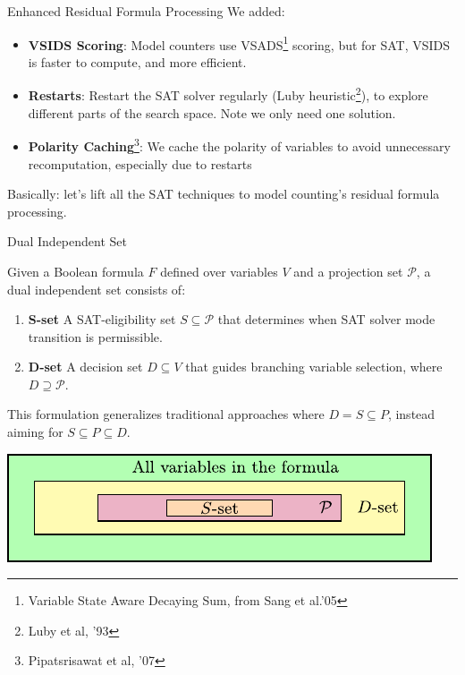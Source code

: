 \documentclass[aspectratio=169]{beamer}
\begin{document}
\begin{frame}{Enhanced Residual Formula Processing}
We added:
\begin{itemize}
  \item \textbf{VSIDS Scoring}: Model counters use VSADS\footnote{\color{blue}Variable State Aware Decaying Sum, from Sang et al.'05} scoring, but for
      SAT, VSIDS is faster to compute, and more efficient.
    \item \textbf{Restarts}: Restart the SAT solver regularly (Luby
      heuristic\footnote{\color{blue}Luby et al, '93}), to
      explore different parts of the search space. Note we only need one
      solution.
    \item \textbf{Polarity Caching}\footnote{\color{blue}Pipatsrisawat et al, '07}: We cache the polarity of variables to
      avoid unnecessary recomputation, especially due to restarts
\end{itemize}
\bigskip

Basically: let's lift all the SAT techniques to model counting's residual formula processing.
\end{frame}

\begin{frame}{Dual Independent Set}
\begin{definition}
Given a Boolean formula $F$ defined over variables $V$ and a projection set
$\mathcal{P}$, a dual independent set consists of:
\begin{enumerate}
  \item \textbf{S-set} A SAT-eligibility set $S\subseteq \mathcal{P}$ that
    determines when SAT solver mode transition is permissible.
    \item \textbf{D-set} A decision set $D\subseteq V$ that guides branching
      variable selection, where $D \supseteq \mathcal{P}$.
\end{enumerate}
This formulation generalizes traditional approaches where $D = S \subseteq P$,
instead aiming for $S \subseteq P \subseteq D$.
\end{definition}
\bigskip

{
\begin{center}
  \includegraphics[scale=0.99]{figs/vars_fig.pdf}
\end{center}
}
\end{frame}
\end{document}

